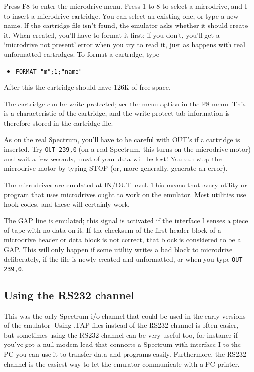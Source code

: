     Press F8 to enter the microdrive menu.  Press 1 to 8 to select a
    microdrive, and I to insert a microdrive cartridge.  You can select an
    existing one, or type a new name.  If the cartridge file isn't found,
    the emulator asks whether it should create it.  When created, you'll
    have to format it first; if you don't, you'll get a `microdrive not
    present' error when you try to read it, just as happens with real
    unformatted cartridges.  To format a cartridge, type
\begin{itemize}
  \item[] \verb|FORMAT "m";1;"name"|
\end{itemize}
    After this the cartridge should have 126K of free space.

    The cartridge can be write protected; see the menu option in the F8
    menu.  This is a characteristic of the cartridge, and the write protect
    tab information is therefore stored in the cartridge file.

    As on the real Spectrum, you'll have to be careful with OUT's if a
    cartridge is inserted.  Try \verb|OUT 239,0|
    (on a real Spectrum, this turns on
    the microdrive motor) and wait a few seconds; most of your data will be
    lost!  You can stop the microdrive motor by typing STOP (or, more
    generally, generate an error).

    The microdrives are emulated at IN/OUT level.  This means that every
    utility or program that uses microdrives ought to work on the emulator.
    Most utilities use hook codes, and these will certainly work.

    The GAP line is emulated; this signal is activated if the interface I
    senses a piece of tape with no data on it.  If the checksum of the first
    header block of a microdrive header or data block is not correct, that
    block is considered to be a GAP\@.  This will only happen if some utility
    writes a bad block to microdrive deliberately, if the file is newly
    created and unformatted, or when you type \verb|OUT 239,0|.



\subsection{Using the RS232 channel}

    This was the only Spectrum i/o channel that could be used in the early
    versions of the emulator.  Using .TAP files instead of the RS232 channel
    is often easier, but sometimes using the RS232 channel can be very
    useful too, for instance if you've got a null-modem lead that connects a
    Spectrum with interface I to the PC you can use it to transfer data and
    programs easily.  Furthermore, the RS232 channel is the easiest way to
    let the emulator communicate with a PC printer.

